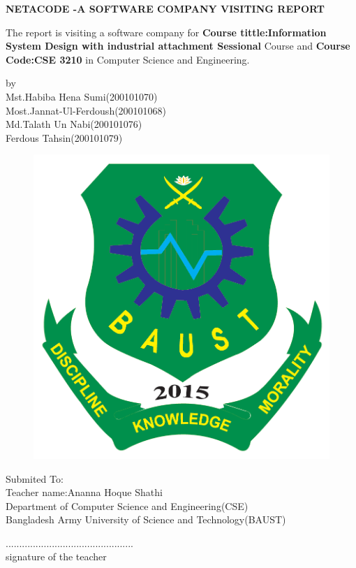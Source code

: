 \documentclass[a4paper,12pt]{report}
\begin{document}
	\begin{center}
		\textbf{NETACODE -A SOFTWARE COMPANY VISITING REPORT}\\
		\begin{flushleft}
			The report is visiting a software company for \textbf{Course tittle:Information System Design with industrial attachment Sessional} Course and \textbf{Course Code:CSE 3210} in Computer Science and Engineering.\\
		\end{flushleft}
				by\\	
			Mst.Habiba Hena Sumi(200101070)\\Most.Jannat-Ul-Ferdoush(200101068)\\Md.Talath Un Nabi(200101076)\\Ferdous Tahsin(200101079)\\
			
			\begin{figure}[h]
				\centering
				\includegraphics[width=0.4\linewidth]{"BAUST_logo.png"}
				\label{fig:images-1}
			\end{figure}
		
		\vspace{1 cm}
			Submited To:\\
			Teacher name:Ananna Hoque Shathi\\
			Department of Computer Science and Engineering(CSE)\\
			Bangladesh Army University of Science and Technology(BAUST)\\
			
		\end{center}
	
	\begin{flushright}
		\vspace{4 cm}
		...............................................\\
		signature of the teacher
	\end{flushright}
\newpage
\tableofcontents
\listoffigures
\newpage
\end{document}
